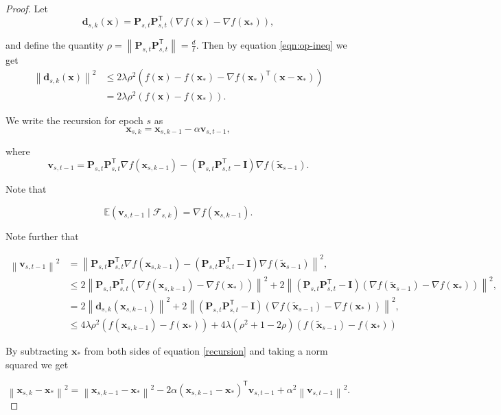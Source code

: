 \documentclass[11pt] {article}
\newcommand{\norm}[1]{\left\lVert#1\right\rVert}
\newcommand{\x}{\pmb{x}}
\renewcommand{\d}{\pmb{d}}
\renewcommand{\v}{\pmb{v}_{s,t-1}}
\renewcommand{\P}{\pmb{P}_{s,t}}
\newcommand{\I}{\pmb{I}}
\newcommand{\Expectation}{\mathbb{E}}
\newcommand{\T}{\mathsf{T}}
\begin{document}
\begin{proof}
	Let \begin{equation*}
	\d_{s,k}(\x) = \P\P^{\T}\left(\nabla f(\x) - \nabla f(\x_*)\right),
	\end{equation*}
	
	and define the quantity $\rho = \norm{\P\P^{\T}}=\frac{d}{\ell}$. Then by equation \eqref{eqn:op-ineq} we get 
	\begin{align*}
	\norm{\d_{s,k}(\x)}^2 &\leq 2\lambda\rho^2 \left(f(\x)- f(\x_*) - \nabla f(\x_*)^{\T}(\x-\x_*) \right) \\
	&= 2\lambda\rho^2\left(f(\x)-f(\x_*)\right).
	\end{align*}
	
	We write the recursion for epoch $s$ as 
	\begin{equation}\label{recursion}
	\x_{s,k} = \x_{s,k-1} - \alpha \v,
	\end{equation}
	
	where 
	\begin{equation*}
	\v  =  \P\P^{\T}\nabla f(\x_{s,k-1}) - \left(\P\P^{\T}-\I\right)\nabla f(\tilde{\x}_{s-1}).
	\end{equation*}
	
	Note that 
	
	\begin{equation}\label{expectation} 
	\Expectation (\v\mid \mathcal{F}_{s,k}) = \nabla f(\x_{s,k-1}).
	\end{equation}
	
	Note further that 
	
	\begin{align}\label{normv}
	\nonumber \norm{\v}^2&= \norm{\P\P^{\T}\nabla f(\x_{s,k-1}) - \left(\P\P^{\T}-\I\right)\nabla f(\tilde{\x}_{s-1})}^2,\\
	\nonumber&\leq 2 \norm{\P\P^{\T}(\nabla f(\x_{s,k-1})-\nabla f(\x_*))}^2 + 2\norm{\left(\P\P^{\T}-\I\right)(\nabla f(\tilde{\x}_{s-1})-\nabla f(\x_*))}^2,\\
	\nonumber&= 2\norm{\d_{s,k}(\x_{s,k-1})}^2 +2\norm{\left(\P\P^{\T}-\I\right)(\nabla f(\tilde{\x}_{s-1})-\nabla f(\x_*))}^2, \\
	&\leq 4\lambda\rho^2 (f(\x_{s,k-1}) - f(\x_*)) + 4\lambda(\rho^2+1-2\rho)(f(\tilde{\x}_{s-1}) - f(\x_*))
	\end{align}
	
	By subtracting $\x_*$ from both sides of equation \eqref{recursion} and taking a norm squared we get
	
	\begin{equation*}
	\norm{\x_{s,k}-\x_*}^2 = \norm{\x_{s,k-1}-\x_*}^2 - 2\alpha (\x_{s,k-1}-\x_*)^{\T}\v + \alpha^2 \norm{\v}^2.
	\end{equation*}
	

\end{proof}
\end{document}
